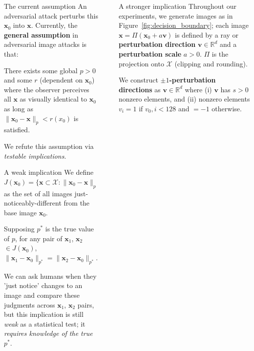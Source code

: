 \documentclass[final,notheorems]{beamer}
\newlength{\sepwidth}
\newlength{\colwidth}
\newcommand{\separatorcolumn}{\begin{column}{\sepwidth}\end{column}}
\providecommand{\norm}[1]{\lVert#1\rVert}
\def\bfx{\mathbf x}
\def\bfv{\mathbf v}
\def\X{\mathcal X}
\def\R{\mathbb R}
\begin{document}
\begin{frame}[t]
\begin{columns}[t]
\begin{column}{\colwidth}
\begin{alertblock}{The current assumption}
    An adversarial attack perturbs this $\bfx_0$ into $\bfx$. Currently, the \textbf{general assumption} in adversarial image attacks is that:

    \hspace*{.1\linewidth}\colorbox{highlightbg}{\begin{minipage}{.8\linewidth}
      There exists some global $p>0$ and some $r$ (dependent on $\bfx_0$) where the observer perceives all $\bfx$ as visually identical to $\bfx_0$ as long as $\norm{\bfx_0-\bfx}_p < r(x_0)$ is satisfied.
    \end{minipage}}

    We refute this assumption via \emph{testable implications}.
  \end{alertblock}

  \begin{block}{A weak implication}
    We define $J(\bfx_0) = \{\bfx \subset \X : \norm{\bfx_0-\bfx}_p = r(\bfx_0)\}$ as the set of all images just-noticeably-different from the base image $\bfx_0$.

    \hspace*{.1\linewidth}\colorbox{highlightbg}{\begin{minipage}{.8\linewidth}
      Supposing $p^*$ is the true value of $p$, for any pair of $\bfx_1$, $\bfx_2$ $\in J(\bfx_0)$, $\norm{\bfx_1-\bfx_0}_{p^*} = \norm{\bfx_2-\bfx_0}_{p^*}$.
    \end{minipage}}

    We can ask humans when they 'just notice' changes to an image and compare these judgments across $\bfx_1$, $\bfx_2$ pairs, but this implication is still \emph{weak} as a statistical test; it \emph{requires knowledge of the true $p^*$}.
  \end{block}
\end{column}

\separatorcolumn

\begin{column}{\colwidth}

  \begin{block}{A stronger implication}
    Throughout our experiments, we generate images as in Figure~\ref{fig:decision_boundary};
    each image $\bfx = \Pi(\bfx_0+a\bfv)$ is defined by a ray or \textbf{perturbation direction} $\bfv \in \R^d$ and a \textbf{perturbation scale} $a>0$.
    $\Pi$ is the projection onto $\X$ (clipping and rounding).

    We construct \textbf{$\pm 1$-perturbation directions} as $\bfv\in\R^d$ where
    (i) $\bfv$ has $s>0$ nonzero elements, and
    (ii) nonzero elements $v_i = 1$ if $v_0,i < 128$ and $=-1$ otherwise.


\end{block}
\end{column}
\end{columns}
\end{frame}
\end{document}
